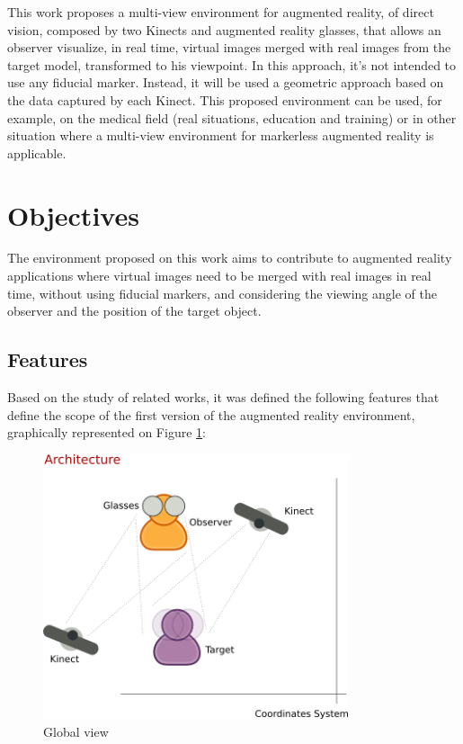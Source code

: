 \documentclass[msc, a4paper, classic, en]{ufbathesis}
\begin{document}
This work proposes a multi-view environment for augmented reality, of direct vision, composed by two Kinects \cite{kinect} and augmented reality glasses, that allows an observer visualize, in real time, virtual images merged with real images from the target model, transformed to his viewpoint. In this approach, it's not intended to use any fiducial marker. Instead, it will be used a geometric approach based on the data captured by each Kinect. This proposed environment can be used, for example, on the medical field (real situations, education and training) or in other situation where a multi-view environment for markerless augmented reality is applicable. 

\section{Objectives}

The environment proposed on this work aims to contribute to augmented reality applications where virtual images need to be merged with real images in real time, without using fiducial markers, and considering the viewing angle of the observer and the position of the target object.

\subsection{Features}

Based on the study of related works, it was defined the following features that define the scope of the first version of the augmented
reality environment, graphically represented on Figure \ref{fig:diagram}:

\begin{figure}
\centering
\includegraphics[width=0.8\textwidth]{images/diagram.png}
\caption{Global view}
\label{fig:diagram}
\end{figure}
\end{document}
